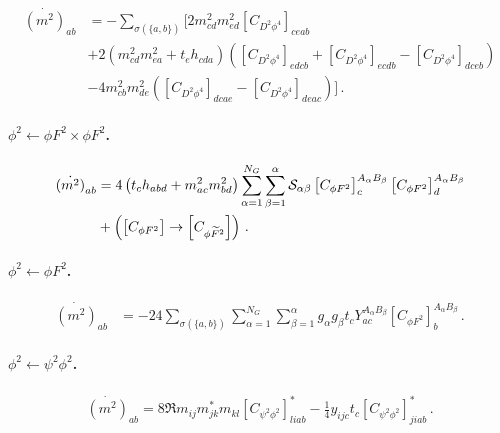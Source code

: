 \begin{align}
    \dot{(m^2)}_{ab} &= -\sum_{\sigma(\{a,b\})}\Bigg[2 m_{cd}^2 m_{ed}^2\left[C_{D^2\phi^4}\right]_{ceab}
    \nonumber \\
    &+2\left(m_{cd}^2 m_{ea}^2 + t_e h_{cda}\right)\left(\left[C_{D^2\phi^4}\right]_{edcb}+\left[C_{D^2\phi^4}\right]_{ecdb}-\left[C_{D^2\phi^4}\right]_{dceb}\right)\nonumber \\
    &-4m^2_{cb} m^2_{de}
    \left(
    \left[C_{D^2\phi^4}\right]_{dcae}-\left[C_{D^2\phi^4}\right]_{deac}
    \right)
    \Bigg]\,.\label{eq:phi2<-D2phi4}
\end{align}

\paragraph{\texorpdfstring{$\phi^2 \leftarrow \phi F^2 \times \phi F^2$}{phi2fromphiF2xphiF2}.}

\begin{align}
    \dot{(m^2)}_{ab} &= 4\left(t_{c}h_{abd}+ m^2_{ac} m^2_{bd}\right) \sum_{\alpha=1}^{N_G}\sum_{\beta=1}^\alpha \mathcal{S}_{\alpha\beta} \left[C_{\phi F^2}\right]_{c}^{A_\alpha B_\beta} \left[C_{\phi F^2}\right]_{d}^{A_\alpha B_\beta}\nonumber \\
    &+ \left(\left[C_{\phi F^2}\right]\to \left[C_{\phi \widetilde{F}^2}\right]\right)\,.
    \label{eq:phi2<-phiF2xphiF2}
\end{align}

\paragraph{\texorpdfstring{$\phi^2 \leftarrow \phi F^2$}{phi2fromphiF2}.}

\begin{align}
    \dot{(m^2)}_{ab} &=
    -24\sum_{\sigma(\{a,b\})} \sum_{\alpha=1}^{N_G} \sum_{\beta=1}^{\alpha} g_\alpha g_\beta t_{c} Y_{ac}^{A_\alpha B_\beta} \left[C_{\phi F^2}\right]_{b}^{A_\alpha B_\beta}\,.
    \label{eq:phi2<-phiF2}
\end{align}

\paragraph{\texorpdfstring{$\phi^2\leftarrow \psi^2\phi^2$}{smassfrompsi2phi2}.}

\begin{align}
    \dot{(m^2)}_{ab} = 8\Re{m_{ij} m_{jk}^*m_{kl}\left[C_{\psi^2\phi^2}\right]_{liab}^* -\frac{1}{4} y_{ijc}t_{c}\left[C_{\psi^2\phi^2}\right]_{jiab}^*}\,.\label{smass_psi2phi3}
\end{align}


